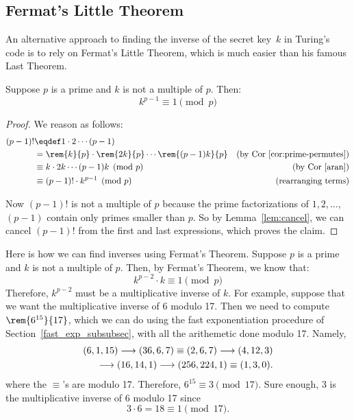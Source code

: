 
\subsection{Fermat's Little Theorem}

An alternative approach to finding the inverse of the secret key~$k$
in Turing's code is to rely on Fermat's Little Theorem, which is much
easier than his famous Last Theorem.  \iffalse ---and more useful.\fi

\begin{theorem}\label{fermat_little}
Suppose $p$ is a prime and $k$ is not a multiple of $p$.  Then:
%
\[
k^{p-1} \equiv 1 \pmod{p}
\]
\end{theorem}

\begin{proof}
We reason as follows:
\begin{align*}
(p-1)! &\eqdef 1 \cdot 2 \cdots (p-1)\\
       & = \rem{k}{p} \cdot \rem{2k}{p} \cdots \rem{(p-1)k}{p}
           & \text{(by Cor~\ref{cor:prime-permutes})}\\
       & \equiv k \cdot 2k \cdots (p-1) k \pmod{p}
           & \text{(by Cor~\ref{aran})}\\
       & \equiv (p-1)! \cdot k^{p-1} \pmod{p}
           & \text{(rearranging terms)}\\
\end{align*}

Now $(p - 1)!$ is not a multiple of $p$ because the prime
factorizations of $1, 2, \dots$, $(p - 1)$ contain only primes smaller
than $p$.  So by Lemma~\ref{lem:cancel}, we can cancel $(p - 1)!$ from
the first and last expressions, which proves the claim.
\end{proof}

Here is how we can find inverses using Fermat's Theorem.  Suppose $p$
is a prime and $k$ is not a multiple of $p$.  Then, by Fermat's
Theorem, we know that:
%
\[
k^{p-2} \cdot k \equiv 1 \pmod{p}
\]
Therefore, $k^{p-2}$ must be a multiplicative inverse of $k$.  For
example, suppose that we want the multiplicative inverse of 6 modulo
17.  Then we need to compute $\rem{6^{15}}{17}$, which we can do using
the fast exponentiation procedure of Section~\ref{fast_exp_subsubsec},
with all the arithemetic done modulo 17.  Namely,
\begin{align*}
(6,1,15) \mathrel{\longrightarrow} (36,6,7) \equiv (2,6,7) \mathrel{\longrightarrow} (4,12,3)\\
\mathrel{\longrightarrow} (16,14,1) \mathrel{\longrightarrow} (256, 224, 1) \equiv (1, 3, 0).
\end{align*}
where the $\equiv$'s are modulo 17.  Therefore, $6^{15} \equiv 3
\pmod{17}$.  Sure enough, 3 is the multiplicative inverse of 6 modulo
17 since
\[
3 \cdot 6 = 18 \equiv 1 \pmod{17}.
\]

